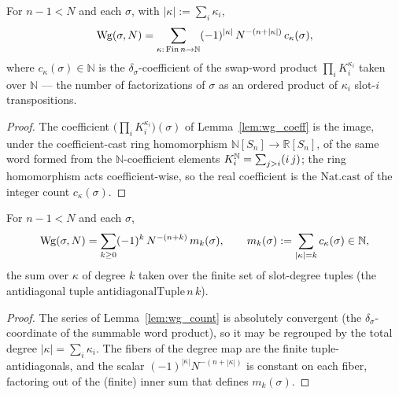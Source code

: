 \begin{lemma}\label{lem:wg_count}
\leanok
{}
For $n-1<N$ and each $\sigma$, with $|\kappa|:=\sum_i\kappa_i$,
\[
\operatorname{Wg}(\sigma,N)
=\sum_{\kappa:\,\mathrm{Fin}\,n\to\mathbb N}
(-1)^{|\kappa|}\,N^{-(n+|\kappa|)}\,c_\kappa(\sigma),
\]
where $c_\kappa(\sigma)\in\mathbb N$ is the $\delta_\sigma$-coefficient of the
swap-word product $\prod_iK_i^{\kappa_i}$ taken over $\mathbb N$ --- the number
of factorizations of $\sigma$ as an ordered product of $\kappa_i$ slot-$i$
transpositions.
\end{lemma}
\begin{proof}\leanok{}
The coefficient $\bigl(\prod_iK_i^{\kappa_i}\bigr)(\sigma)$ of
Lemma~\ref{lem:wg_coeff} is the image, under the coefficient-cast ring
homomorphism $\mathbb N[S_n]\to\mathbb R[S_n]$, of the same word formed from the
$\mathbb N$-coefficient elements $K_i^{\mathbb N}=\sum_{j>i}(i\,j)$; the
ring homomorphism acts coefficient-wise, so the real coefficient is the
$\mathrm{Nat.cast}$ of the integer count $c_\kappa(\sigma)$.
\end{proof}

\begin{lemma}\label{lem:wg_degree}
\leanok
{}
For $n-1<N$ and each $\sigma$,
\[
\operatorname{Wg}(\sigma,N)
=\sum_{k\ge0}(-1)^k\,N^{-(n+k)}\,m_k(\sigma),
\qquad
m_k(\sigma):=\sum_{|\kappa|=k}c_\kappa(\sigma)\in\mathbb N,
\]
the sum over $\kappa$ of degree $k$ taken over the finite set of slot-degree
tuples (the antidiagonal tuple $\mathrm{antidiagonalTuple}\,n\,k$).
\end{lemma}
\begin{proof}\leanok{}
The series of Lemma~\ref{lem:wg_count} is absolutely convergent (the
$\delta_\sigma$-coordinate of the summable word product), so it may be regrouped
by the total degree $|\kappa|=\sum_i\kappa_i$. The fibers of the degree map are
the finite tuple-antidiagonals, and the scalar $(-1)^{|\kappa|}N^{-(n+|\kappa|)}$
is constant on each fiber, factoring out of the (finite) inner sum that defines
$m_k(\sigma)$.
\end{proof}

